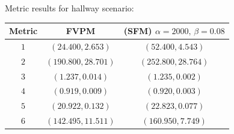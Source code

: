 \documentclass[draftclsnofoot]{IEEEtran}
\begin{document}
\vspace{1cm}

Metric results for hallway scenario:

\begin{tabular}{|c|c|c|}
    \hline 
    Metric & {\scriptsize{FVPM}} & {\scriptsize{(SFM) $\alpha=2000,\,\beta=0.08$}}\tabularnewline
    \hline 
    \hline 
    $1$ & {\scriptsize{$(24.400, 2.653)$}} & {\scriptsize{$(52.400, 4.543)$}}\tabularnewline
    \hline 
    $2$ & {\scriptsize{$(190.800, 28.701)$}} & {\scriptsize{$(252.800, 28.764)$}}\tabularnewline
    \hline 
    $3$ & {\scriptsize{$(1.237, 0.014)$}} & {\scriptsize{$(1.235, 0.002)$}}\tabularnewline
    \hline 
    $4$ & {\scriptsize{$(0.919, 0.009)$}} & {\scriptsize{$(0.920, 0.003)$}}\tabularnewline
    \hline 
    $5$ & {\scriptsize{$(20.922, 0.132)$}} & {\scriptsize{$(22.823, 0.077)$}}\tabularnewline
    \hline 
    $6$ & {\scriptsize{$(142.495, 11.511)$}} & {\scriptsize{$(160.950, 7.749)$}}\tabularnewline
    \hline 
\end{tabular}


%
%

\end{document}
